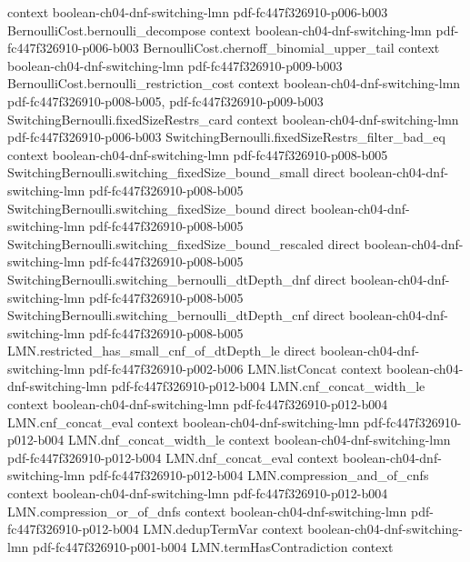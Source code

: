 \begin{lemma}
  {context}
  {boolean-ch04-dnf-switching-lmn}
  {pdf-fc447f326910-p006-b003}
\proofstep
  {BernoulliCost.bernoulli_decompose}
  {context}
  {boolean-ch04-dnf-switching-lmn}
  {pdf-fc447f326910-p006-b003}
\proofstep
  {BernoulliCost.chernoff_binomial_upper_tail}
  {context}
  {boolean-ch04-dnf-switching-lmn}
  {pdf-fc447f326910-p009-b003}
\proofstep
  {BernoulliCost.bernoulli_restriction_cost}
  {context}
  {boolean-ch04-dnf-switching-lmn}
  {pdf-fc447f326910-p008-b005,
    pdf-fc447f326910-p009-b003}
\proofstep
  {SwitchingBernoulli.fixedSizeRestrs_card}
  {context}
  {boolean-ch04-dnf-switching-lmn}
  {pdf-fc447f326910-p006-b003}
\proofstep
  {SwitchingBernoulli.fixedSizeRestrs_filter_bad_eq}
  {context}
  {boolean-ch04-dnf-switching-lmn}
  {pdf-fc447f326910-p008-b005}
\proofstep
  {SwitchingBernoulli.switching_fixedSize_bound_small}
  {direct}
  {boolean-ch04-dnf-switching-lmn}
  {pdf-fc447f326910-p008-b005}
\proofstep
  {SwitchingBernoulli.switching_fixedSize_bound}
  {direct}
  {boolean-ch04-dnf-switching-lmn}
  {pdf-fc447f326910-p008-b005}
\proofstep
  {SwitchingBernoulli.switching_fixedSize_bound_rescaled}
  {direct}
  {boolean-ch04-dnf-switching-lmn}
  {pdf-fc447f326910-p008-b005}
\proofstep
  {SwitchingBernoulli.switching_bernoulli_dtDepth_dnf}
  {direct}
  {boolean-ch04-dnf-switching-lmn}
  {pdf-fc447f326910-p008-b005}
\proofstep
  {SwitchingBernoulli.switching_bernoulli_dtDepth_cnf}
  {direct}
  {boolean-ch04-dnf-switching-lmn}
  {pdf-fc447f326910-p008-b005}
\proofstep
  {LMN.restricted_has_small_cnf_of_dtDepth_le}
  {direct}
  {boolean-ch04-dnf-switching-lmn}
  {pdf-fc447f326910-p002-b006}
\proofstep
  {LMN.listConcat}
  {context}
  {boolean-ch04-dnf-switching-lmn}
  {pdf-fc447f326910-p012-b004}
\proofstep
  {LMN.cnf_concat_width_le}
  {context}
  {boolean-ch04-dnf-switching-lmn}
  {pdf-fc447f326910-p012-b004}
\proofstep
  {LMN.cnf_concat_eval}
  {context}
  {boolean-ch04-dnf-switching-lmn}
  {pdf-fc447f326910-p012-b004}
\proofstep
  {LMN.dnf_concat_width_le}
  {context}
  {boolean-ch04-dnf-switching-lmn}
  {pdf-fc447f326910-p012-b004}
\proofstep
  {LMN.dnf_concat_eval}
  {context}
  {boolean-ch04-dnf-switching-lmn}
  {pdf-fc447f326910-p012-b004}
\proofstep
  {LMN.compression_and_of_cnfs}
  {context}
  {boolean-ch04-dnf-switching-lmn}
  {pdf-fc447f326910-p012-b004}
\proofstep
  {LMN.compression_or_of_dnfs}
  {context}
  {boolean-ch04-dnf-switching-lmn}
  {pdf-fc447f326910-p012-b004}
\proofstep
  {LMN.dedupTermVar}
  {context}
  {boolean-ch04-dnf-switching-lmn}
  {pdf-fc447f326910-p001-b004}
\proofstep
  {LMN.termHasContradiction}
  {context}

\end{lemma}
